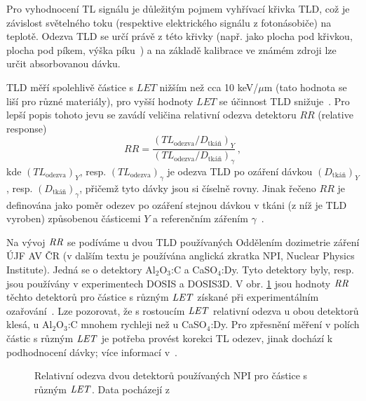 Pro vyhodnocení TL signálu je důležitým pojmem vyhřívací křivka TLD, což je závislost světelného toku (respektive elektrického signálu z fotonásobiče) na teplotě. Odezva TLD se určí právě z této křivky (např. jako plocha pod křivkou, plocha pod píkem, výška píku~\cite{dosis}) a na základě kalibrace ve známém zdroji lze určit absorbovanou dávku.

TLD měří spolehlivě částice s $\mathit{LET}$ nižším než cca 10 keV/$\mu$m (tato hodnota se liší pro různé materiály), pro vyšší hodnoty $\mathit{LET}$ se účinnost TLD snižuje~\cite{passDetectors}. Pro lepší popis tohoto jevu se zavádí veličina relativní odezva detektoru $\mathit{RR}$ (relative response)
\begin{equation}
  \mathit{RR}=\frac{\left(TL_{\text{odezva}}/D_{\text{tkáň}}\right)_Y}{\left(TL_{\text{odezva}}/D_{\text{tkáň}}\right)_{\gamma}}\,,
  \label{eq:detektory_TLD_RR}
\end{equation}
kde $(TL_{\text{odezva}})_Y$, resp. $(TL_{\text{odezva}})_{\gamma}$ je odezva TLD po ozáření dávkou $(D_{\text{tkáň}})_Y$, resp. $(D_{\text{tkáň}})_{\gamma}$, přičemž tyto dávky jsou si číselně rovny. Jinak řečeno $\mathit{RR}$ je definována jako poměr odezev po ozáření stejnou dávkou v tkáni (z níž je TLD vyroben) způsobenou částicemi $Y$ a referenčním zářením $\gamma$~\cite{TLD_RR}. 

Na vývoj $\mathit{RR}$ se podíváme u dvou TLD používaných Oddělením dozimetrie záření ÚJF AV ČR (v dalším textu je používána anglická zkratka NPI, Nuclear Physics Institute). Jedná se o detektory Al$_2$O$_3$:C a CaSO$_4$:Dy. Tyto detektory byly, resp. jsou používány v experimentech DOSIS a DOSIS3D. V obr. \ref{fig:detektory_TLD_RR} jsou hodnoty $\mathit{RR}$ těchto detektorů pro částice s různým $\mathit{LET}$ získané při experimentálním ozařování~\cite{dataTLD_RR}. Lze pozorovat, že s rostoucím $\mathit{LET}$ relativní odezva u obou detektorů klesá, u Al$_2$O$_3$:C mnohem rychleji než u CaSO$_4$:Dy. Pro zpřesnění měření v polích částic s různým $\mathit{LET}$ je potřeba provést korekci TL odezev, jinak dochází k podhodnocení dávky; více informací v~\cite{TLD_RR}.
\begin{figure}[H]
  \centering
  
  \caption{Relativní odezva dvou detektorů používaných NPI pro částice s různým $\mathit{LET}$. Data pocházejí z~\cite{dataTLD_RR}}
  \label{fig:detektory_TLD_RR}
\end{figure}
